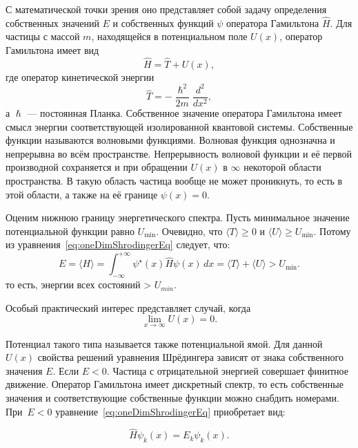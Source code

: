\documentclass[a4paper,12pt]{article}
\begin{document}
С математической точки зрения оно представляет собой задачу определения собственных значений $E$ и собственных функций $\psi$ оператора Гамильтона $\hat{H}$.
Для частицы с массой $m$, находящейся в потенциальном поле $U(x)$, оператор Гамильтона имеет вид
\begin{equation}
    \hat{H} = \hat{T}+ U(x),
    \label{eq:equation}
\end{equation}
где оператор кинетической энергии
\begin{equation}
    \hat{T} =-\frac{\hslash^2}{2m}\frac{d^2}{dx^2},
    \label{eq:equation2}
\end{equation}
а $\hslash$ --- постоянная Планка.
Собственное значение оператора Гамильтона имеет смысл энергии соответствующей изолированной квантовой системы.
Собственные функции называются волновыми функциями.
Волновая функция однозначна и непрерывна во всём пространстве.
Непрерывность волновой функции и её первой производной сохраняется и при обращении $U(x)$ в $\infty$ некоторой области пространства.
В такую область частица вообще не может проникнуть, то есть в этой области, а также на её границе $\psi(x)=0$.

Оценим нижнюю границу энергетического спектра.
Пусть минимальное значение потенциальной функции равно $U_{\min}$.
Очевидно, что $\langle T \rangle \geq 0$ и $\langle U \rangle \geq U_{\min}$.
Потому из уравнения~\eqref{eq:oneDimShrodingerEq} следует, что:
\begin{equation}
    E =\langle H\rangle = \int_{-\infty}^{+\infty} \psi^\star(x)\hat{H}\psi(x) \,dx =\langle T\rangle +\langle U\rangle > U_{\min}.
\label{eq:e_h_integral}
\end{equation}
то есть, энергии всех состояний > $U_{min}$.

Особый практический интерес представляет случай, когда
\begin{equation}
    \lim_{x\to\infty} U(x) = 0.
\label{eq:limit_pot_inf}
\end{equation}

Потенциал такого типа называется также потенциальной ямой.
Для данной $U(x)$ свойства решений уравнения Шрёдингера зависят от знака собственного значения $E$.
Если $E < 0$.
Частица с отрицательной энергией совершает финитное движение.
Оператор Гамильтона имеет дискретный спектр, то есть собственные значения и соответствующие собственные функции можно снабдить номерами.
При~$E < 0$ уравнение~\eqref{eq:oneDimShrodingerEq} приобретает вид\cite{tim}:

\begin{equation}
    \hat{H}\psi_k(x) = E_k\psi_k(x).
    \label{eq:shrodinger_eq_e_less_0}
\end{equation}
\end{document}
